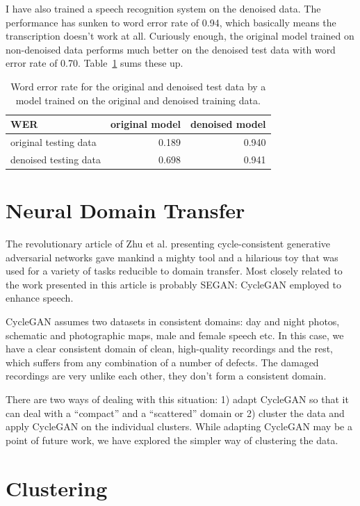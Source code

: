 \documentclass[12pt,a4paper]{report}
\begin{document}
I have also trained a speech recognition system on the denoised data. The
performance has sunken to word error rate of 0.94, which basically means the
transcription doesn't work at all. Curiously enough, the
original model trained on non-denoised data performs much better on the denoised
test data with word error rate of 0.70. Table~\ref{tab:results-denoise} sums
these up.

\begin{table}[htpb]
\caption{Word error rate for the original and denoised test data by a model trained
on the original and denoised training data.}\label{tab:results-denoise}
\centering
\begin{tabular}{|l||r|r|}
\hline
WER    & original model & denoised model \\
\hline
original testing data & 0.189 & 0.940 \\
denoised testing data & 0.698 & 0.941 \\
\hline
\end{tabular}
\end{table}

\section{Neural Domain Transfer}

The revolutionary article of Zhu et al.\cite{cyclegan} presenting
cycle-consistent generative adversarial networks gave mankind a mighty tool and
a hilarious toy that was used for a variety of tasks reducible to
domain transfer.
Most closely related to the work presented in this article is probably
SEGAN\cite{pascual2017segan}: CycleGAN employed to enhance speech.

CycleGAN assumes two datasets in consistent domains: day and night photos,
schematic and photographic maps, male and female speech etc. In this case,
we have a clear consistent domain of clean, high-quality recordings and the
rest, which suffers from any combination of a number of defects. The damaged
recordings are very unlike each other, they don't form a consistent domain.

There are two ways of dealing with this situation: 1) adapt CycleGAN so that it
can deal with a ``compact'' and a ``scattered'' domain or 2) cluster the
data and apply CycleGAN on the individual clusters. While adapting CycleGAN may be a
point of future work, we have explored the simpler way of clustering the data.

\section{Clustering}
\end{document}
